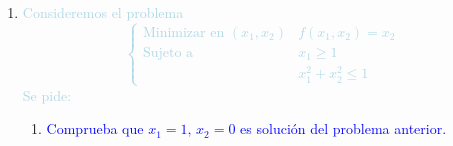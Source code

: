 \documentclass[12pt]{article}
\newcommand{\bboxed}[1]{\fcolorbox{lightblue}{lightblue!10}{$#1$}}
\newcommand{\lb}[1]{\textcolor{lightblue}{#1}}
\newcommand{\db}[1]{\textcolor{blue}{#1}}
\begin{document}
\begin{enumerate}[label=\color{red}\arabic*.]
\begin{enumerate}[label=\color{red}\alph*)]
    	$\Theta(\mu)=\mathcal{L}(\mu-1,\mu-1,\mu)=\mu-1+\mu-\mu+\dfrac{1}{2}\left[(\mu1)^2+(\mu-1)^2\right]+\mu(1-\mu+1-\mu+1)=-\mu^2+3\mu-1$
    	
    	\[ (Dual)=\begin{cases}
    	\text{Maximizar} & \Theta(\mu)=-\mu^2+3\mu-1\\
    	\text{Sujeto a} & \mu\ge0
    	\end{cases} \]
    	
    	$\Theta'(\mu)=-2\mu+3=0\longrightarrow\bboxed{\mu*=\dfrac{3}{2}}$
    	
    	
    	\item \db{Resuelve el problema dual anterior e infiere de ello que la solución del problema original es $x_1=x_2=\dfrac{1}{2}$.}
    	$\begin{array}{l}
    	x_1^*=x_2^*=\dfrac{3}{2}-1=\dfrac{1}{2}
    	\end{array}$
    \end{enumerate}
    \item \lb{Consideremos el problema \[ \begin{cases}
    \text{Minimizar en }(x_1,x_2) & f(x_1,x_2)=x_2\\
    \text{Sujeto a}& x_1\ge1\\
     & x_1^2+x_2^2\le1
    \end{cases} \]Se pide:}
    \begin{enumerate}[label=\color{red}\alph*)]
    	\item \db{Comprueba que $x_1=1,\, x_2=0$ es solución del problema anterior.}
    	

\end{enumerate}
\end{enumerate}
\end{document}
